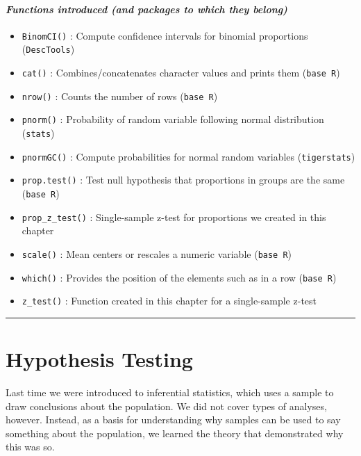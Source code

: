 \documentclass[
]{book}
\providecommand{\tightlist}{%
  \setlength{\itemsep}{0pt}\setlength{\parskip}{0pt}}
\begin{document}
\hypertarget{functions-introduced-and-packages-to-which-they-belong-5}{%
\paragraph*{\texorpdfstring{\emph{Functions introduced (and packages to which they belong)}}{Functions introduced (and packages to which they belong)}}\label{functions-introduced-and-packages-to-which-they-belong-5}}

\begin{itemize}
\tightlist
\item
  \texttt{BinomCI()} : Compute confidence intervals for binomial proportions (\texttt{DescTools})
\item
  \texttt{cat()} : Combines/concatenates character values and prints them (\texttt{base\ R})
\item
  \texttt{nrow()} : Counts the number of rows (\texttt{base\ R})
\item
  \texttt{pnorm()} : Probability of random variable following normal distribution (\texttt{stats})
\item
  \texttt{pnormGC()} : Compute probabilities for normal random variables (\texttt{tigerstats})
\item
  \texttt{prop.test()} : Test null hypothesis that proportions in groups are the same (\texttt{base\ R})
\item
  \texttt{prop\_z\_test()} : Single-sample z-test for proportions we created in this chapter
\item
  \texttt{scale()} : Mean centers or rescales a numeric variable (\texttt{base\ R})
\item
  \texttt{which()} : Provides the position of the elements such as in a row (\texttt{base\ R})
\item
  \texttt{z\_test()} : Function created in this chapter for a single-sample z-test
\end{itemize}

\begin{center}\rule{0.5\linewidth}{0.5pt}\end{center}

\hypertarget{hypothesis-testing}{%
\section{Hypothesis Testing}\label{hypothesis-testing}}

Last time we were introduced to inferential statistics, which uses a sample to draw conclusions about the population. We did not cover types of analyses, however. Instead, as a basis for understanding why samples can be used to say something about the population, we learned the theory that demonstrated why this was so.
\end{document}
